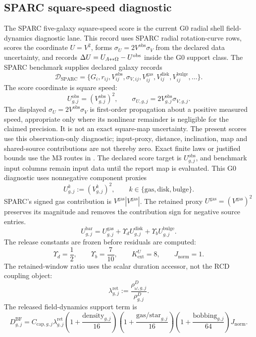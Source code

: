 \subsection{SPARC square-speed diagnostic}\label{manual:sparc-square-speed-diagnostic}
The SPARC five-galaxy square-speed score is the current G0 radial shell field-dynamics diagnostic lane. This record uses SPARC radial rotation-curve rows, scores the coordinate \(U=V^2\), forms \(\sigma_U=2V^{\mathrm{obs}}\sigma_V\) from the declared data uncertainty, and records \(\Delta U=U_{A{\leftrightarrow}\Omega}-U^{\mathrm{obs}}\) inside the G0 support class.
The SPARC benchmark supplies declared galaxy records
\[
\mathcal D_{\mathrm{SPARC}}
=\{G_i,r_{ij},V^{\mathrm{obs}}_{ij},\sigma_{V,ij},V^{\mathrm{gas}}_{ij},V^{\mathrm{disk}}_{ij},V^{\mathrm{bulge}}_{ij},\ldots\}.
\]
The score coordinate is square speed:
\[
U^{\mathrm{obs}}_{g,j}=(V^{\mathrm{obs}}_{g,j})^2,
\qquad
\sigma_{U,g,j}=2V^{\mathrm{obs}}_{g,j}\sigma_{V,g,j}.
\]
The displayed \(\sigma_U=2V^{\mathrm{obs}}\sigma_V\) is first-order
propagation about a positive measured speed, appropriate only where its
nonlinear remainder is negligible for the claimed precision. It is not an
exact square-map uncertainty. The present scores use this observation-only
diagnostic; input-proxy, distance, inclination, map and shared-source
contributions are not thereby zero. Exact finite laws or justified bounds
use the M3 routes in . The declared score target is \(U^{\mathrm{obs}}_{g,j}\), and benchmark input columns remain input data until the report map is evaluated. This G0 diagnostic uses nonnegative component proxies
\[
U^k_{g,j}:=(V^k_{g,j})^2,
\qquad k\in\{\mathrm{gas},\mathrm{disk},\mathrm{bulge}\}.
\]
SPARC's signed gas contribution is \(V^{\mathrm{gas}}|V^{\mathrm{gas}}|\). The retained proxy \(U^{\mathrm{gas}}=(V^{\mathrm{gas}})^2\) preserves its magnitude and removes the contribution sign for negative source entries.
\[
U^{\mathrm{bar}}_{g,j}
=
U^{\mathrm{gas}}_{g,j}
+
\Upsilon_d U^{\mathrm{disk}}_{g,j}
+
\Upsilon_b U^{\mathrm{bulge}}_{g,j}.
\]
The release constants are frozen before residuals are computed:
\[
\Upsilon_d=\frac12,
\qquad
\Upsilon_b=\frac{7}{10},
\qquad
K^U_{\mathrm{ext}}=8,
\qquad
J_{\mathrm{norm}}=1.
\]
The retained-window ratio uses the scalar duration accessor, not the RCD coupling object:
\[
\lambda^{\mathrm{ret}}_{g,j}:=\frac{\rho^D_{\omega,g,j}}{\rho^D_{g,j}}.
\]
The released field-dynamics support term is
\[
D^{\mathrm{BF}}_{g,j}
=
C_{\mathrm{cap},g,j}\lambda^{\mathrm{ret}}_{g,j}
\left(1+\frac{\mathrm{density}_{g,j}}{16}\right)
\left(1+\frac{\mathrm{gas/star}_{g,j}}{16}\right)
\left(1+\frac{\mathrm{bobbing}_{g,j}}{64}\right)J_{\mathrm{norm}}.
\]

